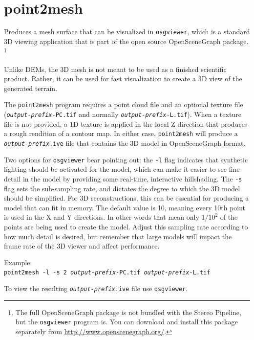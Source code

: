 \section{point2mesh}
\label{point2mesh}

Produces a mesh surface that can be visualized in {\tt osgviewer},
which is a standard 3D viewing application that is part of the open
source OpenSceneGraph package.  \footnote{The full OpenSceneGraph package
is not bundled with the Stereo Pipeline, but the \texttt{osgviewer} program
is.  You can download and install this package separately from
\url{http://www.openscenegraph.org/}.}

Unlike \acp{DEM}, the 3D mesh is not meant to be used as a finished
scientific product.  Rather, it can be used for fast visualization
to create a 3D view of the generated terrain.

The \texttt{point2mesh} program requires a point cloud file and an
optional texture file (\texttt{\textit{output-prefix}-PC.tif} and
normally \texttt{\textit{output-prefix}-L.tif}). When a texture
file is not provided, a 1D texture is applied in the local Z direction
that produces a rough rendition of a contour map.  In either case,
\texttt{point2mesh} will produce a \texttt{\textit{output-prefix}.ive}
file that contains the 3D model in OpenSceneGraph format.

Two options for \texttt{osgviewer} bear pointing out: the \texttt{-l}
flag indicates that synthetic lighting should be activated for the
model, which can make it easier to see fine detail in the model by
providing some real-time, interactive hillshading.  The \verb#-s#
flag sets the sub-sampling rate, and dictates the degree to which
the 3D model should be simplified.  For 3D reconstructions, this
can be essential for producing a model that can fit in memory.  The
default value is 10, meaning every 10th point is used in the X and
Y directions. In other words that mean only $1/10^2$ of the points
are being used to create the model. Adjust this sampling rate
according to how much detail is desired, but remember that large
models will impact the frame rate of the 3D viewer and affect
performance.

Example:\\
\hspace*{2em}\texttt{point2mesh -l -s 2 \textit{output-prefix}-PC.tif \textit{output-prefix}-L.tif}

To view the resulting \texttt{\textit{output-prefix}.ive} file use
\texttt{osgviewer}.

